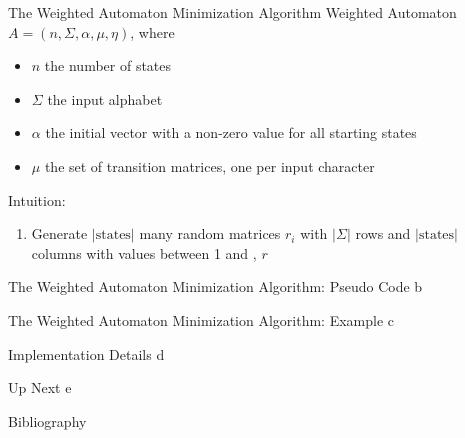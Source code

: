\documentclass[rgb]{beamer}
\begin{document}
    \begin{frame}{The Weighted Automaton Minimization Algorithm}
        Weighted Automaton $A = \left( n, \Sigma, \alpha, \mu, \eta \right)$, where
        \begin{itemize}
         \item $n$ the number of states
         \item $\Sigma$ the input alphabet
         \item $\alpha$ the initial vector with a non-zero value for all starting states
         \item $\mu$ the set of transition matrices, one per input character
        \end{itemize}

        Intuition:
        \begin{enumerate}
         \item Generate $|\text{states}|$ many random matrices $r_i$ with $|\Sigma|$ rows and $|\text{states}|$ columns with values between 1 and , $r$
        \end{enumerate}

    \end{frame}

    \begin{frame}{The Weighted Automaton Minimization Algorithm: Pseudo Code}
        b%
    \end{frame}

    \begin{frame}{The Weighted Automaton Minimization Algorithm: Example}
        c%
    \end{frame}
    
    \begin{frame}{Implementation Details}
        d
    \end{frame}
    
    
    \begin{frame}{Up Next}
        e
    \end{frame}
  
    
    \begin{frame}{Bibliography}
        \printbibliography
    \end{frame}
\end{document}
